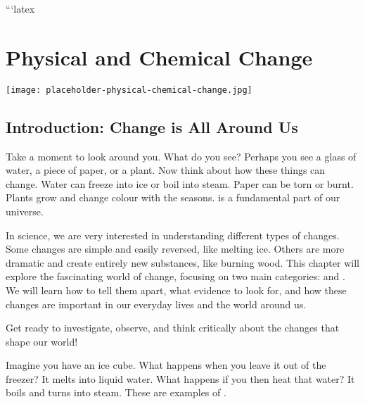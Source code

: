 ```latex
\chapter{Physical and Chemical Change}

\begin{marginfigure}
\texttt{[image: placeholder-physical-chemical-change.jpg]}
\end{marginfigure}

\section*{Introduction: Change is All Around Us}

Take a moment to look around you. What do you see?  Perhaps you see a glass of water, a piece of paper, or a plant. Now think about how these things can change. Water can freeze into ice or boil into steam. Paper can be torn or burnt. Plants grow and change colour with the seasons.   is a fundamental part of our universe.

In science, we are very interested in understanding different types of changes. Some changes are simple and easily reversed, like melting ice. Others are more dramatic and create entirely new substances, like burning wood. This chapter will explore the fascinating world of change, focusing on two main categories:  and . We will learn how to tell them apart, what evidence to look for, and how these changes are important in our everyday lives and the world around us.

\begin{marginnote}
\end{marginnote}

Get ready to investigate, observe, and think critically about the changes that shape our world!

\FloatBarrier
\1

Imagine you have an ice cube. What happens when you leave it out of the freezer? It melts into liquid water. What happens if you then heat that water? It boils and turns into steam. These are examples of .

